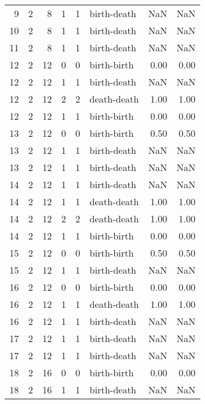\documentclass{article}
\begin{document}
\begin{center}
\begin{tabular}{rrrrrlrr}
9 & 2 & 8 & 1 & 1 & birth-death & NaN & NaN \\
10 & 2 & 8 & 1 & 1 & birth-death & NaN & NaN \\
11 & 2 & 8 & 1 & 1 & birth-death & NaN & NaN \\
12 & 2 & 12 & 0 & 0 & birth-birth & 0.00 & 0.00 \\
12 & 2 & 12 & 1 & 1 & birth-death & NaN & NaN \\
12 & 2 & 12 & 2 & 2 & death-death & 1.00 & 1.00 \\
12 & 2 & 12 & 1 & 1 & birth-birth & 0.00 & 0.00 \\
13 & 2 & 12 & 0 & 0 & birth-birth & 0.50 & 0.50 \\
13 & 2 & 12 & 1 & 1 & birth-death & NaN & NaN \\
13 & 2 & 12 & 1 & 1 & birth-death & NaN & NaN \\
14 & 2 & 12 & 1 & 1 & birth-death & NaN & NaN \\
14 & 2 & 12 & 1 & 1 & death-death & 1.00 & 1.00 \\
14 & 2 & 12 & 2 & 2 & death-death & 1.00 & 1.00 \\
14 & 2 & 12 & 1 & 1 & birth-birth & 0.00 & 0.00 \\
15 & 2 & 12 & 0 & 0 & birth-birth & 0.50 & 0.50 \\
15 & 2 & 12 & 1 & 1 & birth-death & NaN & NaN \\
16 & 2 & 12 & 0 & 0 & birth-birth & 0.00 & 0.00 \\
16 & 2 & 12 & 1 & 1 & death-death & 1.00 & 1.00 \\
16 & 2 & 12 & 1 & 1 & birth-death & NaN & NaN \\
17 & 2 & 12 & 1 & 1 & birth-death & NaN & NaN \\
17 & 2 & 12 & 1 & 1 & birth-death & NaN & NaN \\
18 & 2 & 16 & 0 & 0 & birth-birth & 0.00 & 0.00 \\
18 & 2 & 16 & 1 & 1 & birth-death & NaN & NaN \\
\bottomrule
\end{tabular}


\end{center}
\end{document}
